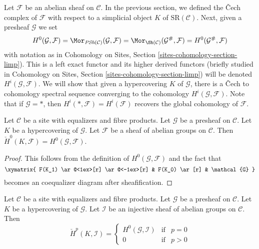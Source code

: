 \medskip\noindent
Let $\mathcal{F}$ be an abelian sheaf on $\mathcal{C}$.
In the previous section, we defined the {\v C}ech complex of $\mathcal{F}$
with respect to a simplicial object $K$ of $\text{SR}(\mathcal{C})$.
Next, given a presheaf $\mathcal{G}$ we set
$$
H^0(\mathcal{G}, \mathcal{F}) =
\Mor_{\textit{PSh}(\mathcal{C})}(\mathcal{G}, \mathcal{F}) =
\Mor_{\Sh(\mathcal{C})}(\mathcal{G}^\#, \mathcal{F}) =
H^0(\mathcal{G}^\#, \mathcal{F})
$$
with notation as in
Cohomology on Sites, Section \ref{sites-cohomology-section-limp}).
This is a left exact functor and its higher derived functors
(briefly studied in
Cohomology on Sites, Section \ref{sites-cohomology-section-limp})
will be denoted $H^i(\mathcal{G}, \mathcal{F})$.
We will show that given a hypercovering $K$ of $\mathcal{G}$,
there is a {\v C}ech to cohomology spectral sequence converging to the
cohomology $H^i(\mathcal{G}, \mathcal{F})$.
Note that if $\mathcal{G} = *$, then
$H^i(*, \mathcal{F}) = H^i(\mathcal{F})$ recovers
the global cohomology of $\mathcal{F}$.

\begin{lemma}
\label{lemma-h0-cech-variant}
Let $\mathcal{C}$ be a site with equalizers and fibre products.
Let $\mathcal{G}$ be a presheaf on $\mathcal{C}$.
Let $K$ be a hypercovering of $\mathcal{G}$.
Let $\mathcal{F}$ be a sheaf of abelian groups on $\mathcal{C}$.
Then $\check{H}^0(K, \mathcal{F}) = H^0(\mathcal{G}, \mathcal{F})$.
\end{lemma}

\begin{proof}
This follows from the definition of $H^0(\mathcal{G}, \mathcal{F})$
and the fact that
$$
\xymatrix{
F(K_1) \ar@<1ex>[r] \ar@<-1ex>[r] &
F(K_0) \ar[r] & \mathcal{G}
}
$$
becomes an coequalizer diagram after sheafification.
\end{proof}

\begin{lemma}
\label{lemma-injective-trivial-cech-variant}
Let $\mathcal{C}$ be a site with equalizers and fibre products.
Let $\mathcal{G}$ be a presheaf on $\mathcal{C}$.
Let $K$ be a hypercovering of $\mathcal{G}$.
Let $\mathcal{I}$ be an injective sheaf of abelian groups on $\mathcal{C}$.
Then
$$
\check{H}^p(K, \mathcal{I}) =
\left\{
\begin{matrix}
H^0(\mathcal{G}, \mathcal{I}) & \text{if} & p = 0 \\
0 & \text{if} & p > 0
\end{matrix}
\right.
$$
\end{lemma}

